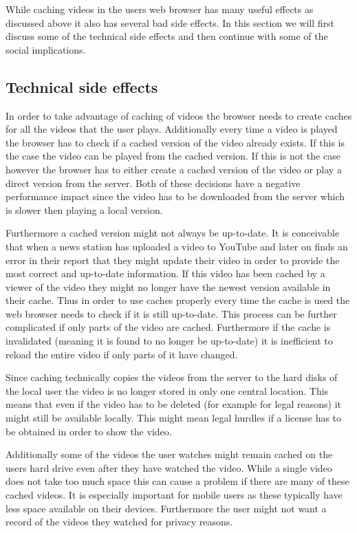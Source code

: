 While caching videos in the users web browser has many useful effects as discussed above it also has several bad side effects. In this section we will first discuss some of the technical side effects and then continue with some of the social implications. 

\subsection{Technical side effects}

In order to take advantage of caching of videos the browser needs to create caches for all the videos that the user plays. Additionally every time a video is played the browser has to check if a cached version of the video already exists. If this is the case the video can be played from the cached version. If this is not the case however the browser has to either create a cached version of the video or play a direct version from the server. Both of these decisions have a negative performance impact since the video has to be downloaded from the server which is slower then playing a local version.

Furthermore a cached version might not always be up-to-date. It is conceivable that when a news station has uploaded a video to YouTube and later on finds an error in their report that they might update their video in order to provide the most correct and up-to-date information. If this video has been cached by a viewer of the video they might no longer have the newest version available in their cache. Thus in order to use caches properly every time the cache is used the web browser needs to check if it is still up-to-date. This process can be further complicated if only parts of the video are cached. Furthermore if the cache is invalidated (meaning it is found to no longer be up-to-date) it is inefficient to reload the entire video if only parts of it have changed.

Since caching technically copies the videos from the server to the hard disks of the local user the video is no longer stored in only one central location. This means that even if the video has to be deleted (for example for legal reasons) it might still be available locally. This might mean legal hurdles if a license has to be obtained in order to show the video.

Additionally some of the videos the user watches might remain cached on the users hard drive even after they have watched the video. While a single video does not take too much space this can cause a problem if there are many of these cached videos. It is especially important for mobile users as these typically have less space available on their devices. Furthermore the user might not want a record of the videos they watched for privacy reasons. 